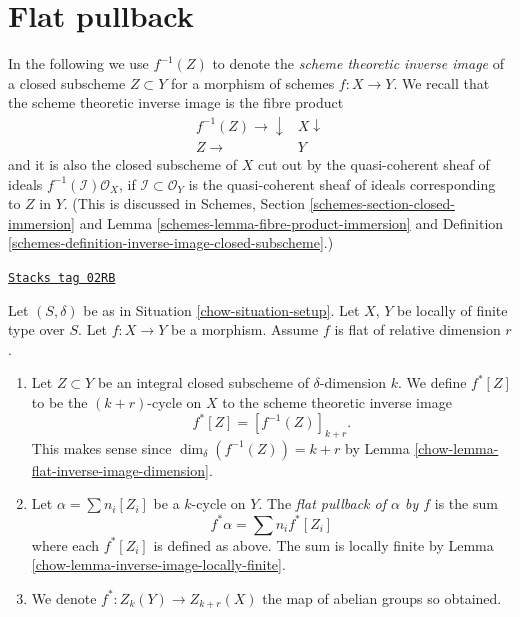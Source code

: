 \section{Flat pullback}
\label{chow-section-flat-pullback}
In the following we use $f^{-1}(Z)$ to denote the
{\it scheme theoretic inverse image} of a closed subscheme
$Z \subset Y$ for a morphism of schemes $f : X \to Y$.
We recall that the scheme theoretic inverse image is the fibre product
$$
\begin{array}{cc}f^{-1}(Z) \longrightarrow\downarrow & X \downarrow \\ Z \longrightarrow & Y\end{array}
$$
and it is also the closed subscheme of $X$ cut out by the
quasi-coherent sheaf of ideals $f^{-1}(\mathcal{I})\mathcal{O}_X$, if
$\mathcal{I} \subset \mathcal{O}_Y$ is the quasi-coherent sheaf of ideals
corresponding to $Z$ in $Y$.
(This is discussed in
Schemes, Section \ref{schemes-section-closed-immersion} and
Lemma \ref{schemes-lemma-fibre-product-immersion}
and Definition \ref{schemes-definition-inverse-image-closed-subscheme}.)

\begin{definition}
\label{chow-definition-flat-pullback}
\href{https://stacks.math.columbia.edu/tag/02RB}{\texttt{Stacks tag 02RB}}

Let $(S, \delta)$ be as in Situation \ref{chow-situation-setup}.
Let $X$, $Y$ be locally of finite type over $S$.
Let $f : X \to Y$ be a morphism.
Assume $f$ is flat of relative dimension $r$.
\begin{enumerate}
\item Let $Z \subset Y$ be an integral closed subscheme of
$\delta$-dimension $k$. We define $f^*[Z]$ to be the
$(k+r)$-cycle on $X$ to the scheme theoretic inverse image
$$
f^*[Z] = [f^{-1}(Z)]_{k+r}.
$$
This makes sense since $\dim_\delta(f^{-1}(Z)) = k + r$
by Lemma \ref{chow-lemma-flat-inverse-image-dimension}.
\item Let $\alpha = \sum n_i [Z_i]$ be
a $k$-cycle on $Y$. The {\it flat pullback of $\alpha$ by $f$}
is the sum
$$
f^* \alpha = \sum n_i f^*[Z_i]
$$
where each $f^*[Z_i]$ is defined as above.
The sum is locally finite by Lemma \ref{chow-lemma-inverse-image-locally-finite}.
\item We denote $f^* : Z_k(Y) \to Z_{k + r}(X)$ the map of abelian
groups so obtained.
\end{enumerate}
\end{definition}


